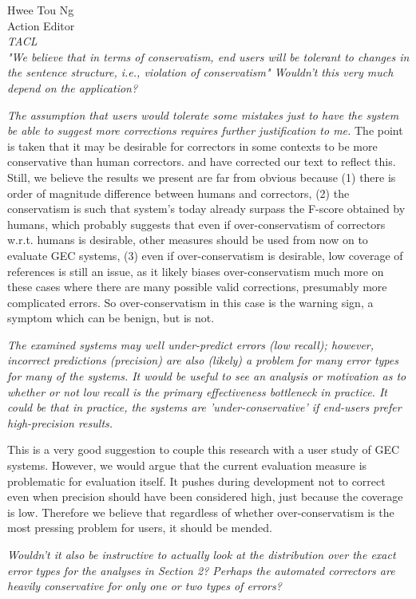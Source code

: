 \documentclass[11pt,letterpaper]{letter}
\begin{document}
\begin{letter}{%
Hwee Tou Ng\\
Action Editor\\
{\em TACL}\\
}
\emph{"We believe that in terms of conservatism, end users will be tolerant to
	changes in the sentence structure, i.e., violation of conservatism" Wouldn't
	this very much depend on the application?
	}

\emph{The assumption that users would tolerate
	some mistakes just to have the system be able to suggest more corrections
	requires further justification to me.
	}
The point is taken that it may be desirable for correctors in some contexts to be more conservative than human correctors. and have corrected our text to reflect this. Still, we believe the results we present are far from obvious because (1) there is order of magnitude difference between humans and correctors, (2) the conservatism is such that system's today already surpass the F-score obtained by humans, which probably suggests that even if over-conservatism of correctors w.r.t. humans is desirable, other measures should be used from now on to evaluate GEC systems, (3) even if over-conservatism is desirable, low coverage of references is still an issue, as it likely biases over-conservatism much more on these cases where there are many possible valid corrections, presumably more complicated errors. So over-conservatism in this case is the warning sign, a symptom which can be benign, but is not.

\emph{The examined systems may well under-predict errors (low recall); however,
	incorrect predictions (precision) are also (likely) a problem for many error
	types for many of the systems. It would be useful to see an analysis or
	motivation as to whether or not low recall is the primary effectiveness
	bottleneck in practice. It could be that in practice, the systems are
	'under-conservative' if end-users prefer high-precision results.
	}

This is a very good suggestion to couple this research with a user study of GEC systems. However, we would argue that the current evaluation measure is problematic for evaluation itself. It pushes during development not to correct even when precision should have been considered high, just because the coverage is low. Therefore we believe that regardless of whether over-conservatism is the most pressing problem for users, it should be mended. 

\emph{Wouldn't it also be instructive to actually look at the distribution
	over the exact error types for the analyses in Section 2? Perhaps the automated correctors are heavily conservative for only one or two types of errors?
	}
	

\end{letter}
\end{document}
